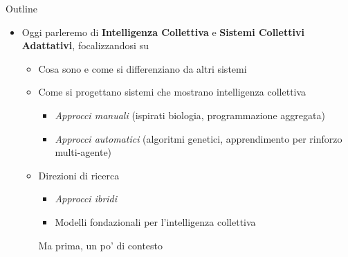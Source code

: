 \documentclass[presentation, 10pt,aspectratio=169]{beamer}\mode<presentation>{\usetheme{AMSBolognaFC}}
\begin{document}
\begin{frame}{Outline}
	\begin{itemize}
		\item Oggi parleremo di \alert{\textbf{Intelligenza Collettiva}} e \alert{\textbf{Sistemi Collettivi Adattativi}}, focalizzandosi su
		\begin{itemize}
			\item Cosa sono e come si differenziano da altri sistemi
			\item Come si progettano sistemi che mostrano intelligenza collettiva
			\begin{itemize}
				\item \emph{Approcci manuali} (ispirati biologia, programmazione aggregata)
				\item \emph{Approcci automatici} (algoritmi genetici, apprendimento per rinforzo multi-agente)
			\end{itemize}
			\item Direzioni di ricerca
			\begin{itemize}
				\item \emph{Approcci ibridi}
				\item Modelli fondazionali per l'intelligenza collettiva
			\end{itemize}
			Ma prima, un po' di contesto \alert{\faSmileO}
		\end{itemize}
	\end{itemize}
\end{frame}
\end{document}

